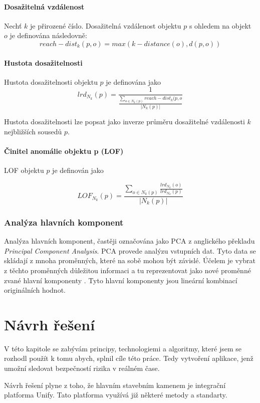 \documentclass[thesis=M,czech]{FITthesis}[2012/10/20]
\begin{document}
			\subsubsection{Dosažitelná vzdálenost}
				Nechť $k$ je přirozené číslo. Dosažitelná vzdálenost objektu $p$ s ohledem na objekt $o$ je definována následovně: 
				$$ reach-dist_k(p, o) = max (k-distance(o), d(p, o)) $$
				
			\subsubsection{Hustota dosažitelnosti}
				Hustota dosažitelnosti objektu $p$ je definována jako
				$$ lrd_{N_k}(p) = \frac{1}{ \frac{\sum_{o \in N_k(p)} reach-dist_k(p,o}{|N_k(p)|}} $$
				
				Hustota dosažitelnosti lze popsat jako inverze průměru dosažitelné vzdálenosti $k$ nejbližších sousedů $p$.
				
			\subsubsection{Činitel anomálie objektu p (LOF)}
				LOF objektu $p$ je definován jako 
				
				$$LOF_{N_k}(p) = \frac{\sum_{o \in N_k(p)} \frac{lrd_{N_k}(o)}{lrd_{N_k}(p)}}{|N_k(p)|} $$		
		
		\subsection{Analýza hlavních komponent}
		\label{sec:pca}
		Analýza hlavních komponent, častěji označována jako PCA z anglického překladu \textit{Principal Component Analysis}. PCA provede analýzu vstupních dat. Tyto data se skládají z mnoha proměnných, které na sobě mohou být závislé. Účelem je vybrat z těchto proměnných důležitou informaci a tu reprezentovat jako nové proměnné zvané hlavní komponenty \cite{PCA_book}. Tyto hlavní komponenty jsou lineární kombinací originálních hodnot.
		
	

\chapter{Návrh řešení}
	V této kapitole se zabývám principy, technologiemi a algoritmy, které jsem se rozhodl použít k tomu abych, splnil cíle této práce. Tedy vytvoření aplikace, jenž umožní sledovat bezpečností rizika v reálném čase.
	
	Návrh řešení plyne z toho, že hlavním stavebním kamenem je integrační platforma Unify. Tato platforma využívá již některé metody a standarty. 
	
\end{document}
